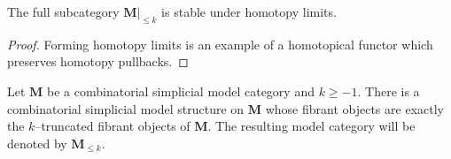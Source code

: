 \begin{corollary}\label{cor:truncated-objects-limits}
  The full subcategory \(\mathbf{M}|_{{\leq} k}\) is stable under homotopy limits.
\end{corollary}
\begin{proof}
  Forming homotopy limits is an example of a homotopical functor which preserves homotopy pullbacks.
\end{proof}

\begin{theorem}\label{thm:truncated-model-structure-exists}
  Let \(\mathbf{M}\) be a combinatorial simplicial model category and \(k\geq -1\). There is a combinatorial simplicial model structure on \(\mathbf{M}\) whose fibrant objects are exactly the \(k\)--truncated fibrant objects of \(\mathbf{M}\). The resulting model category will be denoted by \(\mathbf{M}_{\leq k}\).
\end{theorem}
